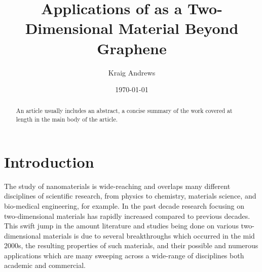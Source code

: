 \documentclass[%
 reprint,
 amsmath,amssymb,
 aps,
pra,
]{revtex4-1}
\begin{document}

\title{Applications of  as a Two-Dimensional Material Beyond Graphene}%

\author{Kraig Andrews}%
%




\date{\today}%

\begin{abstract}
An article usually includes an abstract, a concise summary of the work
covered at length in the main body of the article. 
\end{abstract}

\maketitle


\section{\label{sec:introduction} Introduction}
The study of nanomaterials is wide-reaching and overlaps many different disciplines of scientific research, from physics to chemistry, materials science, and bio-medical engineering, for example. In the past decade research focusing on two-dimensional materials has rapidly increased compared to previous decades. This swift jump in the amount literature and studies being done on various two-dimensional materials is due to several breakthroughs which occurred in the mid 2000s, the resulting properties of such materials, and their possible and numerous applications which are many sweeping across a wide-range of disciplines both academic and commercial. 
\end{document}
